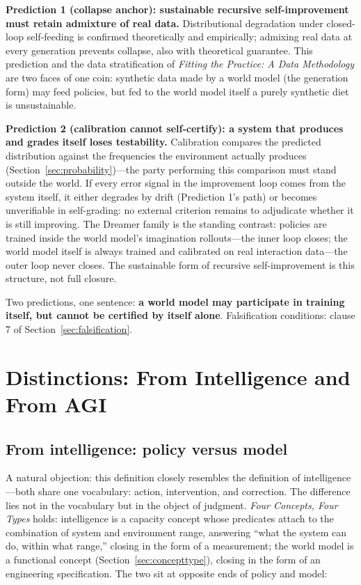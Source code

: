 \documentclass[10pt]{article}
\begin{document}
\textbf{Prediction 1 (collapse anchor): sustainable recursive self-improvement must retain admixture of real data.} Distributional degradation under closed-loop self-feeding is confirmed theoretically and empirically\cite{shumailov2024}; admixing real data at every generation prevents collapse, also with theoretical guarantee\cite{gerstgrasser2024}. This prediction and the data stratification of \emph{Fitting the Practice: A Data Methodology}\cite{yu2026methodology} are two faces of one coin: synthetic data made by a world model (the generation form) may feed policies, but fed to the world model itself a purely synthetic diet is unsustainable.

\textbf{Prediction 2 (calibration cannot self-certify): a system that produces and grades itself loses testability.} Calibration compares the predicted distribution against the frequencies the environment actually produces (Section~\ref{sec:probability})---the party performing this comparison must stand outside the world. If every error signal in the improvement loop comes from the system itself, it either degrades by drift (Prediction 1's path) or becomes unverifiable in self-grading: no external criterion remains to adjudicate whether it is still improving. The Dreamer family is the standing contrast: policies are trained inside the world model's imagination rollouts---the inner loop closes; the world model itself is always trained and calibrated on real interaction data---the outer loop never closes\cite{hafner2025inside}. The sustainable form of recursive self-improvement is this structure, not full closure.

Two predictions, one sentence: \textbf{a world model may participate in training itself, but cannot be certified by itself alone}. Falsification conditions: clause 7 of Section~\ref{sec:falsification}.

\section{Distinctions: From Intelligence and From AGI}\label{sec:distinction}

\subsection{From intelligence: policy versus model}\label{sec:policy}

A natural objection: this definition closely resembles the definition of intelligence---both share one vocabulary: action, intervention, and correction. The difference lies not in the vocabulary but in the object of judgment. \emph{Four Concepts, Four Types}\cite{yu2026fourconcepts} holds: intelligence is a capacity concept whose predicates attach to the combination of system and environment range, answering ``what the system can do, within what range,'' closing in the form of a measurement; the world model is a functional concept (Section~\ref{sec:concepttype}), closing in the form of an engineering specification. The two sit at opposite ends of policy and model:
\end{document}

